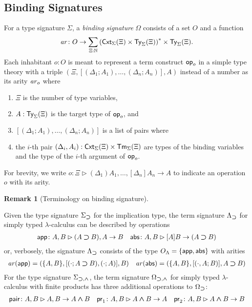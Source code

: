 \documentclass[acmsmall,screen]{acmart}
\theoremstyle{acmdefinition}
\newtheorem{remark}[theorem]{Remark}}
\begin{document}
\subsection{Binding Signatures} \label{subsec:binding-sig}
\begin{definition}\label{def:binding-signature}
  For a type signature $\Sigma$, a \emph{binding signature} $\Omega$ consists of a set $O$ and a function
  \[
    \mathit{ar}\colon O \to \sum_{\Xi : \mathbb{N}} \left(\mathsf{Cxt}_\Sigma(\Xi) \times \mathsf{Ty}_\Sigma(\Xi)\right)^* \times \mathsf{Ty}_\Sigma(\Xi).
  \]
  Each inhabitant $o: O$ is meant to represent a term construct $\mathsf{op}_o$ in a simple type theory with a triple $\left(\Xi, \left[\left(\Delta_1; A_1\right), \ldots, \left(\Delta_{n}; A_{n}\right) \right], A\right)$
  instead of a number as its arity $\mathit{ar}_o$ where
  \begin{enumerate}
    \item $\Xi$ is the number of type variables, 
    \item $A : \mathsf{Ty}_\Sigma(\Xi)$ is the target type of $\mathsf{op}_o$, and
    \item $\left[\left(\Delta_1; A_{1}\right), \ldots, \left(\Delta_{n}; A_{n}\right) \right]$ is a list of pairs where
    \item the $i$-th pair $(\Delta_i, A_i) :\mathsf{Cxt}_{\Sigma}(\Xi) \times \mathsf{Tm}_{\Sigma}(\Xi)$ are types of the binding variables and the type of the $i$-th argument of $\mathsf{op}_{o}$.
  \end{enumerate}
  For brevity, we write $o \colon \Xi \rhd (\Delta_1)A_{1}, \ldots, \left[\Delta_{n}\right] A_{n} \to A$ to indicate an operation $o$ with its arity. 
\end{definition}
\begin{remark}[Terminology on binding signature]
  \cite{Aczel1978,Fiore2010}
\end{remark}


\begin{example} \label{ex:STLC-sig}
  Given the type signature $\Sigma_{\mathbin{\bm{\supset}}}$ for the implication type, the term signature $\Lambda_{\mathbin{\bm{\supset}}}$ for simply typed $\lambda$-calculus can be described by operations
  \begin{align*}
    \mathsf{app}\colon A, B \rhd (A \mathbin{\bm{\supset}} B), A \to B && \mathsf{abs}\colon A , B \rhd [A]B \to (A \mathbin{\bm{\supset}} B)
  \end{align*}
    or, verbosely, the signature $\Lambda_{\mathbin{\bm{\supset}}}$ consists of the type $O_\Lambda = \{\mathsf{app}, \mathsf{abs}\}$ with arities
  \begin{align*}
    \mathit{ar}(\mathsf{app}) = (\{A, B\}, [(\cdot; A \mathbin{\bm{\supset}} B), (\cdot; A)], B)
    && 
    \mathit{ar}(\mathsf{abs}) = (\{A, B\}, [(\cdot, A; B)], A \mathbin{\bm{\supset}} B)
  \end{align*}
  For the type signature $\Sigma_{\mathbin{\bm{\supset}}, \mathbin{\bm{\wedge}}}$, the term signature $\Omega_{\mathbin{\bm{\supset}}, \mathbin{\bm{\wedge}}}$ for simply typed $\lambda$-calculus with finite products has three additional operations
to $\Omega_{\mathbin{\bm{\supset}}}$:
  \begin{align*}
    \mathsf{pair}\colon A, B \rhd A, B \to A \mathbin{\bm{\wedge}} B
    && \mathsf{pr}_{1} \colon A, B \rhd A \mathbin{\bm{\wedge}} B \to A
    && \mathsf{pr}_{2} \colon A, B \rhd A \mathbin{\bm{\wedge}} B \to B
  \end{align*}
\end{example}
\end{document}
